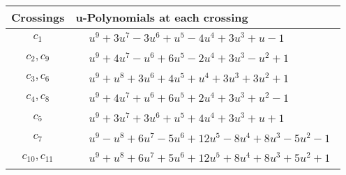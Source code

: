 \documentclass[1p]{elsarticle_modified}
\theoremstyle{definition}
\begin{document}
\begin{tabular}{m{50pt}|m{274pt}}
Crossings & \hspace{64pt}u-Polynomials at each crossing \\
\hline $$\begin{aligned}c_{1}\end{aligned}$$&$\begin{aligned}
&u^9+3 u^7-3 u^6+u^5-4 u^4+3 u^3+u-1
\end{aligned}$\\
\hline $$\begin{aligned}c_{2},c_{9}\end{aligned}$$&$\begin{aligned}
&u^9+4 u^7- u^6+6 u^5-2 u^4+3 u^3- u^2+1
\end{aligned}$\\
\hline $$\begin{aligned}c_{3},c_{6}\end{aligned}$$&$\begin{aligned}
&u^9+u^8+3 u^6+4 u^5+u^4+3 u^3+3 u^2+1
\end{aligned}$\\
\hline $$\begin{aligned}c_{4},c_{8}\end{aligned}$$&$\begin{aligned}
&u^9+4 u^7+u^6+6 u^5+2 u^4+3 u^3+u^2-1
\end{aligned}$\\
\hline $$\begin{aligned}c_{5}\end{aligned}$$&$\begin{aligned}
&u^9+3 u^7+3 u^6+u^5+4 u^4+3 u^3+u+1
\end{aligned}$\\
\hline $$\begin{aligned}c_{7}\end{aligned}$$&$\begin{aligned}
&u^9- u^8+6 u^7-5 u^6+12 u^5-8 u^4+8 u^3-5 u^2-1
\end{aligned}$\\
\hline $$\begin{aligned}c_{10},c_{11}\end{aligned}$$&$\begin{aligned}
&u^9+u^8+6 u^7+5 u^6+12 u^5+8 u^4+8 u^3+5 u^2+1
\end{aligned}$\\
\hline
\end{tabular}\\~\\
\end{document}

